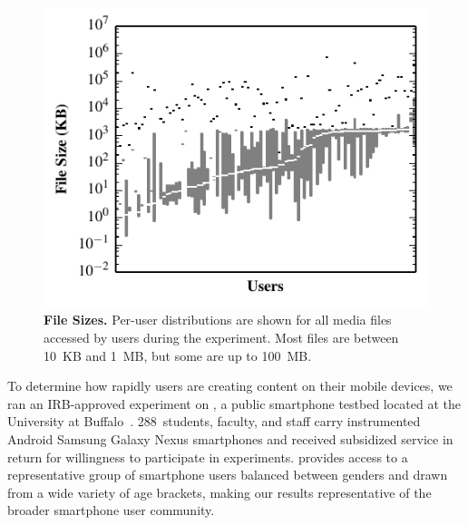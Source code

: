 \begin{figure}[t]


\includegraphics{./figures/pocketlocker/FileSizeDistributionGraph.pdf}


\caption{\small \textbf{File Sizes.} Per-user distributions are shown for all
media files accessed by users during the experiment. Most files
are between 10~KB and 1~MB, but some are up to 100~MB.}

\label{fig-motivation-totals}

\vspace*{-0.2in}

\end{figure}
To determine how rapidly users are creating content on their mobile devices,
we ran an IRB-approved experiment on \PhoneLab{}, a public smartphone testbed
located at the University at Buffalo~\cite{nandugudi2013phonelab}.
288~students, faculty, and staff carry instrumented Android Samsung Galaxy
Nexus smartphones and received subsidized service in return for willingness
to participate in experiments. \PhoneLab{} provides access to a
representative group of smartphone users balanced between genders and drawn
from a wide variety of age brackets, making our results representative of the
broader smartphone user community.

